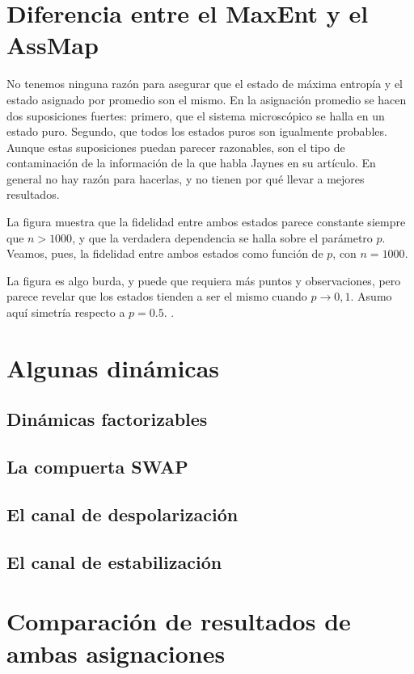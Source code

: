 \section{Diferencia entre el MaxEnt y el AssMap}


No tenemos ninguna razón para asegurar que el estado de máxima entropía y el estado asignado por promedio son el mismo. En la asignación promedio se hacen dos suposiciones fuertes: primero, que el sistema microscópico se halla en un estado puro. Segundo, que todos los estados puros son igualmente probables. Aunque estas suposiciones puedan parecer razonables, son el tipo de contaminación de la información de la que habla Jaynes en su artículo. En general no hay razón para hacerlas, y no tienen por qué llevar a mejores resultados.

La figura  muestra que la fidelidad entre ambos estados parece constante siempre que $n>1000$, y que la verdadera dependencia se halla sobre el parámetro $p$. Veamos, pues, la fidelidad entre ambos estados como función de $p$, con $n=1000$.

La figura  es algo burda, y puede que requiera más puntos y observaciones, pero parece revelar que los estados tienden a ser el mismo cuando $p\rightarrow 0,1$. Asumo aquí simetría respecto a $p=0.5$. .

\section{Algunas dinámicas}

\subsection{Dinámicas factorizables}

\subsection{La compuerta SWAP}

\subsection{El canal de despolarización}

\subsection{El canal de estabilización}

\section{Comparación de resultados de ambas asignaciones}
